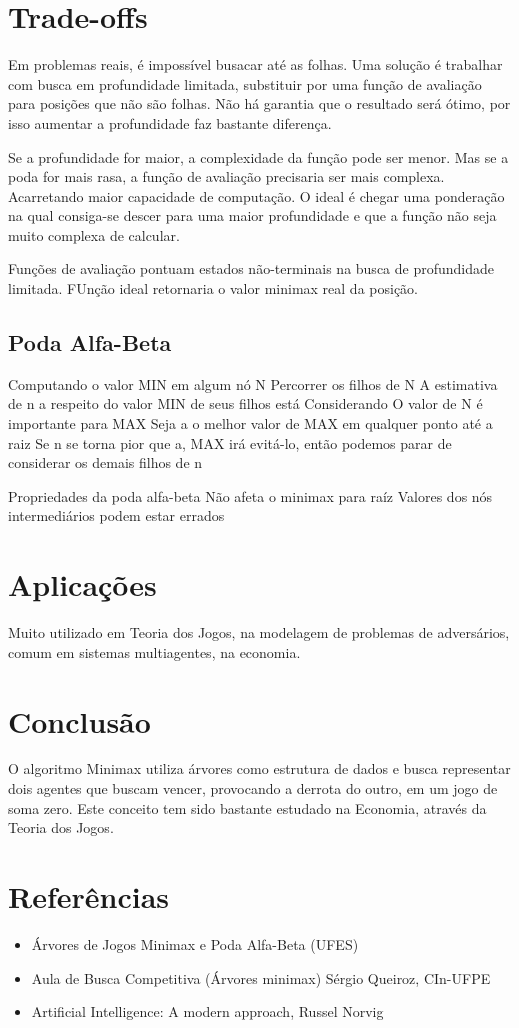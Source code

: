 \documentclass[sigplan,screen]{acmart}
\begin{document}
\section{Trade-offs}

Em problemas reais, é impossível busacar até as folhas. 
Uma solução é trabalhar com busca em profundidade limitada, substituir por uma função de avaliação para posições que não são folhas.
Não há garantia que o resultado será ótimo, por isso aumentar a profundidade faz bastante diferença.

Se a profundidade for maior, a complexidade da função pode ser menor. Mas se a poda for mais rasa, a função de avaliação precisaria ser mais complexa. 
Acarretando maior capacidade de computação. 
O ideal é chegar uma ponderação na qual consiga-se descer para uma maior profundidade e que a função não seja muito complexa de calcular.

Funções de avaliação pontuam estados não-terminais na busca de profundidade limitada.
FUnção ideal retornaria o valor minimax real da posição.

\subsection{Poda Alfa-Beta}
Computando o valor MIN em algum nó N
Percorrer os filhos de N
A estimativa de n a respeito do valor MIN de seus filhos está Considerando
O valor de N é importante para MAX
Seja a o melhor valor de MAX em qualquer ponto até a raiz
Se n se torna pior que a, MAX irá evitá-lo, então podemos parar de considerar os demais filhos de n

Propriedades da poda alfa-beta
Não afeta o minimax para raíz
Valores dos nós intermediários podem estar errados

\section{Aplicações}
Muito utilizado em Teoria dos Jogos, na modelagem de problemas de adversários, comum em sistemas multiagentes, na economia.

\section{Conclusão}
O algoritmo Minimax utiliza árvores como estrutura de dados e busca representar dois agentes que buscam vencer, provocando a derrota do outro, em um jogo de soma zero. 
Este conceito tem sido bastante estudado na Economia, através da Teoria dos Jogos. 

\section{Referências}
\begin{itemize}
  \item {Árvores de Jogos Minimax e Poda Alfa-Beta (UFES)}\
  \item {Aula de Busca Competitiva (Árvores minimax) Sérgio Queiroz, CIn-UFPE}\
  \item {Artificial Intelligence: A modern approach, Russel Norvig}\
\end{itemize}



\end{document}
